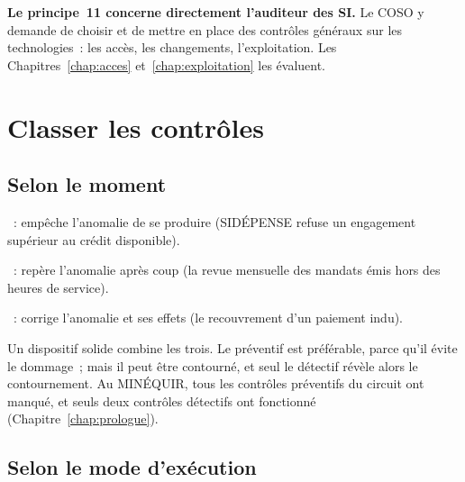 \begin{boxinfo}
\textbf{Le principe~11 concerne directement l'auditeur des SI.} Le COSO
y demande de choisir et de mettre en place des contrôles généraux sur les
technologies~: les accès, les changements, l'exploitation. Les
Chapitres~\ref{chap:acces} et~\ref{chap:exploitation} les évaluent.
\end{boxinfo}

\separateur

\section{Classer les contrôles}
\label{sec:c02-types}

\subsection{Selon le moment}

\begin{boxdef}
~: empêche
l'anomalie de se produire (SIDÉPENSE refuse un engagement supérieur au
crédit disponible).

\medskip
{}~: repère l'anomalie
après coup (la revue mensuelle des mandats émis hors des heures de
service).

\medskip
{}~: corrige
l'anomalie et ses effets (le recouvrement d'un paiement indu).
\end{boxdef}

Un dispositif solide combine les trois. Le préventif est préférable,
parce qu'il évite le dommage~; mais il peut être contourné, et seul le
détectif révèle alors le contournement. Au MINÉQUIR, tous les contrôles
préventifs du circuit ont manqué, et seuls deux contrôles détectifs ont
fonctionné (Chapitre~\ref{chap:prologue}).

\subsection{Selon le mode d'exécution}

